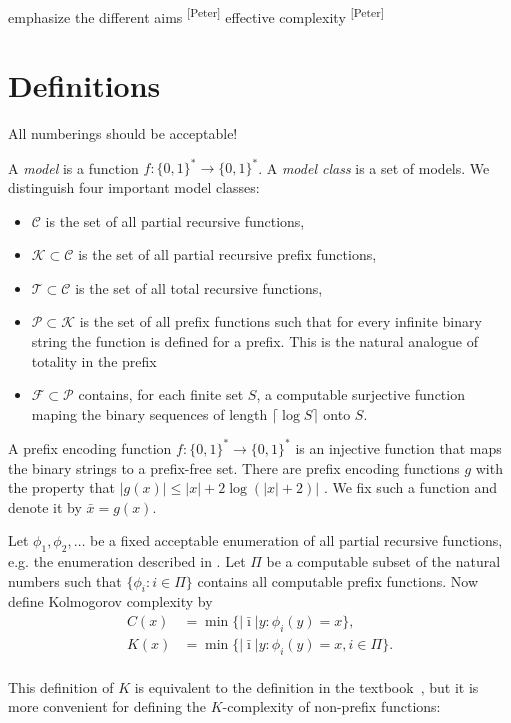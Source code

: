 \documentclass{style/llncs}
\newcommand{\C}{\mathcal C}
\newcommand{\T}{\mathcal T}
\newcommand{\F}{\mathcal F}
\renewcommand{\P}{\mathcal P}
\newcommand{\K}{\mathcal K}
\newcommand{\pb}[1]{\textcolor{OliveGreen}{\small #1 \textsuperscript{[Peter]} }}
\begin{document}
\pb{emphasize the different aims}
\pb{effective complexity}

\section{Definitions}


All numberings should be acceptable!

\begin{definition}
  A \emph{model} is a function $f:\{0,1\}^*\to\{0,1\}^*$. A
  \emph{model class} is a set of models. We distinguish four important
  model classes:
  \begin{itemize}
  \item $\C$ is the set of all partial recursive functions,
  \item $\K\subset\C$ is the set of all partial recursive prefix
    functions,
  \item $\T\subset\C$ is the set of all total recursive functions,
  \item $\P\subset\K$ is the set of all prefix functions such that for
    every infinite binary string the function is defined for a
    prefix. This is the natural analogue of totality in the prefix
  \item $\F\subset\P$ contains, for each finite set $S$, a computable
    surjective function maping the binary sequences of length
    $\lceil\log S\rceil$ onto $S$.
  \end{itemize}
\end{definition}

\begin{definition}
  A prefix encoding function $f:\{0,1\}^*\to\{0,1\}^*$ is an injective
  function that maps the binary strings to a prefix-free set. There
  are prefix encoding functions $g$ with the property that
  $|g(x)|\le|x|+2\log(|x|+2)|$ \cite{TODO}. We fix such a function and
  denote it by $\bar x=g(x)$.
\end{definition}

\begin{definition}[Complexity]
  Let $\phi_1,\phi_2,\ldots$ be a fixed acceptable enumeration of all partial
  recursive functions, e.g. the enumeration described in \cite{TODO}.
  Let $\Pi$ be a computable subset of the natural numbers such that
  $\{\phi_i:i\in\Pi\}$ contains all computable prefix functions. Now
  define Kolmogorov complexity by
\begin{align*}
C(x)&=\min\{|\bar\imath| y:\phi_i(y)=x\},\\
K(x)&=\min\{|\bar\imath| y:\phi_i(y)=x, i\in\Pi\}.\\
\end{align*}
\end{definition}
This definition of $K$ is equivalent to the definition in the
textbook~\cite{TODO}, but it is more convenient for defining the
$K$-complexity of non-prefix functions:
\end{document}
